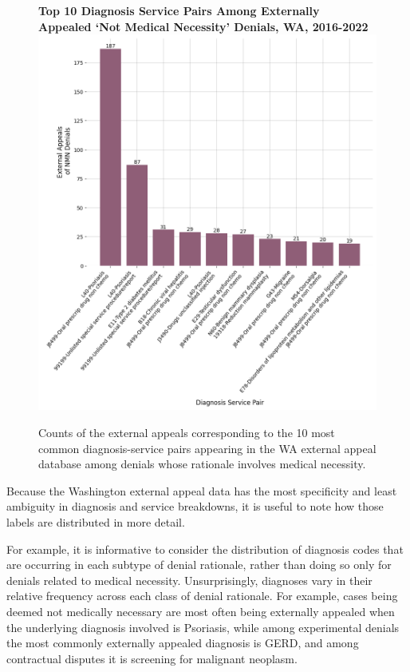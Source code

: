 \documentclass[12pt, a4paper,twoside]{report}
\theoremstyle{plain} %
\theoremstyle{definition} %
\theoremstyle{remark} %
\numberwithin{equation}{chapter}
\begin{document}
		\begin{figure}[h!]
			\centering
			\textbf{Top 10 Diagnosis Service Pairs Among Externally Appealed `Not Medical Necessity' Denials, WA, 2016-2022}
			\includegraphics[width=.8\textwidth]{images/wa_external_appeals/top_nmn_appeal_diag_service.png}
			\caption{Counts of the external appeals corresponding to the 10 most common diagnosis-service pairs appearing in the WA external appeal database among denials whose rationale involves medical necessity.}
			\label{wanmnexternalappealdiagservice}
		\end{figure}
	
		Because the Washington external appeal data has the most specificity and least ambiguity in diagnosis and service breakdowns, it is useful to note how those labels are distributed in more detail.
		
		For example, it is informative to consider the distribution of diagnosis codes that are occurring in each subtype of denial rationale, rather than doing so only for denials related to medical necessity. Unsurprisingly, diagnoses vary in their relative frequency across each class of denial rationale. For example, cases being deemed not medically necessary are most often being externally appealed when the underlying diagnosis involved is Psoriasis, while among experimental denials the most commonly externally appealed diagnosis is GERD, and among contractual disputes it is screening for malignant neoplasm.
		
\end{document}
